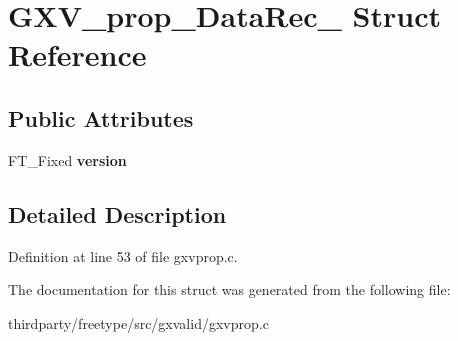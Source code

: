 \hypertarget{struct_g_x_v__prop___data_rec__}{}\section{G\+X\+V\+\_\+prop\+\_\+\+Data\+Rec\+\_\+ Struct Reference}
\label{struct_g_x_v__prop___data_rec__}
\subsection*{Public Attributes}
\begin{DoxyCompactItemize}
\item 
\mbox{\label{struct_g_x_v__prop___data_rec___a76c638110db91eec8c18f2be862d17d7}} 
F\+T\+\_\+\+Fixed {\bfseries version}
\end{DoxyCompactItemize}


\subsection{Detailed Description}


Definition at line 53 of file gxvprop.\+c.



The documentation for this struct was generated from the following file\+:\begin{DoxyCompactItemize}
\item 
thirdparty/freetype/src/gxvalid/gxvprop.\+c\end{DoxyCompactItemize}
